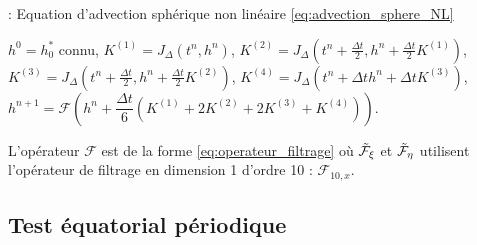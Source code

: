 \begin{center}
\begin{minipage}[H]{12cm}
  \begin{algorithm}[H]
    \caption{: Equation d'advection sphérique non linéaire \eqref{eq:advection_sphere_NL} }\label{alg:RK4_transportSa_NL}
    \begin{algorithmic}[1]
    \State $h^0 = h_0^*$ connu,
             \State  $K^{(1)} = J_{\Delta}(t^n, h^n)$,
             \State  $K^{(2)} = J_{\Delta}\left(t^n + \frac{\Delta t}{2}, h^n + \frac{\Delta t}{2} K^{(1)} \right)$,
             \State  $K^{(3)} = J_{\Delta}\left(t^n + \frac{\Delta t}{2}, h^n + \frac{\Delta t}{2} K^{(2)} \right)$,
             \State  $K^{(4)} = J_{\Delta}\left(t^n + \Delta t h^n + \Delta t K^{(3)} \right)$,  
             \State  $h^{n+1} = \mathcal{F}\left( h^n  + \dfrac{\Delta t}{6} \left( K^{(1)} + 2 K^{(2)} + 2 K^{(3)} + K^{(4)} \right) \right)$.
            \EndFor
    \end{algorithmic}
    \end{algorithm}
\end{minipage}
\end{center}

L'opérateur $\mathcal{F}$ est de la forme \eqref{eq:operateur_filtrage} où $\tilde{\mathcal{F}}_{\xi}$ et $\tilde{\mathcal{F}}_{\eta}$ utilisent l'opérateur de filtrage en dimension 1 d'ordre 10 : $\mathcal{F}_{10,x}$.
























\subsection{Test équatorial périodique}

